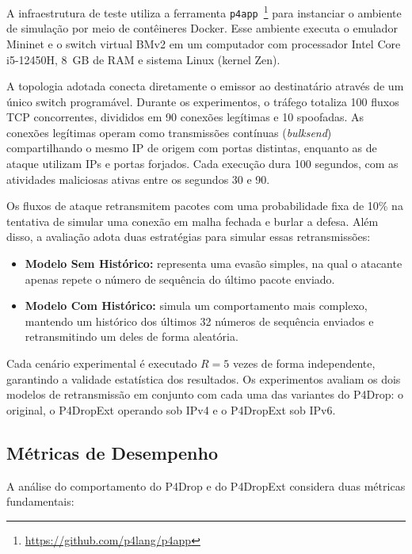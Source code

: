 \documentclass[12pt]{article}
\begin{document}
A infraestrutura de teste utiliza a ferramenta \texttt{p4app}~\footnote{\url{https://github.com/p4lang/p4app}}
para instanciar o ambiente de simulação por meio de contêineres Docker.
Esse ambiente executa o emulador Mininet e o switch virtual BMv2 em um computador com processador Intel Core i5-12450H, 8~GB de RAM e sistema Linux (kernel Zen).

A topologia adotada conecta diretamente o emissor ao destinatário através de um único switch programável.
Durante os experimentos, o tráfego totaliza 100 fluxos TCP concorrentes, divididos em 90 conexões legítimas e 10 spoofadas.
As conexões legítimas operam como transmissões contínuas (\textit{bulksend}) compartilhando o mesmo IP de origem com portas distintas,
enquanto as de ataque utilizam IPs e portas forjados.
Cada execução dura 100 segundos, com as atividades maliciosas ativas entre os segundos 30 e 90.

Os fluxos de ataque retransmitem pacotes com uma probabilidade fixa de 10\% na tentativa de simular uma conexão em malha fechada e burlar a defesa.
Além disso, a avaliação adota duas estratégias para simular essas retransmissões:
\begin{itemize}
    \item \textbf{Modelo Sem Histórico:} representa uma evasão simples,
    na qual o atacante apenas repete o número de sequência do último pacote enviado.
    \item \textbf{Modelo Com Histórico:} simula um comportamento mais complexo,
    mantendo um histórico dos últimos 32 números de sequência enviados e retransmitindo um deles de forma aleatória.
\end{itemize}

Cada cenário experimental é executado $R = 5$ vezes de forma independente, garantindo a validade estatística dos resultados.
Os experimentos avaliam os dois modelos de retransmissão em conjunto com cada uma das variantes do P4Drop:
o original, o P4DropExt operando sob IPv4 e o P4DropExt sob IPv6.

\subsection{Métricas de Desempenho}

A análise do comportamento do P4Drop e do P4DropExt considera duas métricas fundamentais:
\end{document}
